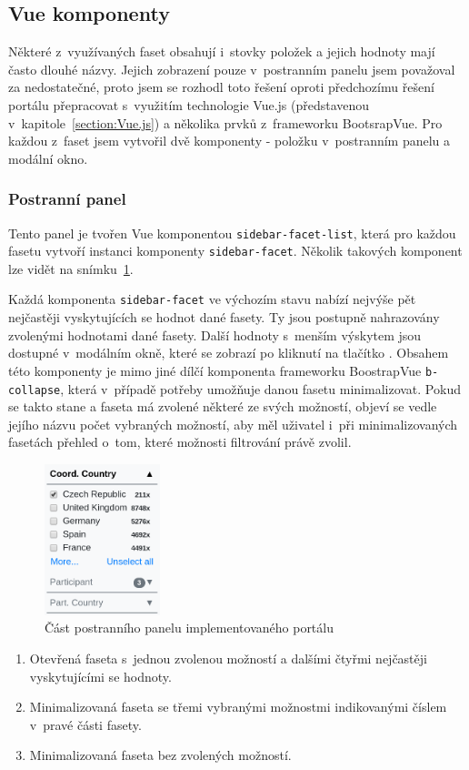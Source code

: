 \subsection{Vue komponenty}
Některé z~využívaných faset obsahují i~stovky položek a jejich hodnoty mají často dlouhé názvy. Jejich zobrazení pouze v~postranním panelu jsem považoval za nedostatečné, proto jsem se rozhodl toto řešení oproti předchozímu řešení portálu přepracovat s~využitím technologie Vue.js (představenou v~kapitole~\ref{section:Vue.js}) a několika prvků z~frameworku BootsrapVue. Pro každou z~faset jsem vytvořil dvě komponenty - položku v~postranním panelu a modální okno.

\subsubsection*{Postranní panel}\label{section:sidebar}
Tento panel je tvořen Vue komponentou \texttt{sidebar-facet-list}, která pro každou fasetu vytvoří instanci komponenty \texttt{sidebar-facet}. Několik takových komponent lze vidět na snímku~\ref{img:sidebar}.

Každá komponenta \texttt{sidebar-facet} ve výchozím stavu nabízí nejvýše pět nejčastěji vyskytujících se hodnot dané fasety. Ty jsou postupně nahrazovány zvolenými hodnotami dané fasety. Další hodnoty s~menším výskytem jsou dostupné v~modálním okně, které se zobrazí po kliknutí na tlačítko . Obsahem této komponenty je mimo jiné dílčí komponenta frameworku BoostrapVue \texttt{b-collapse}, která v~případě potřeby umožňuje danou fasetu minimalizovat. Pokud se takto stane a faseta má zvolené některé ze svých možností, objeví se vedle jejího názvu počet vybraných možností, aby měl uživatel i~při minimalizovaných fasetách přehled o~tom, které možnosti filtrování právě zvolil.

\begin{figure}[H]
	\centering
	\includegraphics[width=0.3\textwidth]{obrazky-figures/my-facet.png}
	\caption{Část postranního panelu implementovaného portálu}
	\label{img:sidebar}
\end{figure}
\begin{enumerate}
    \item Otevřená faseta  s~jednou zvolenou možností a dalšími čtyřmi nejčastěji vyskytujícími se hodnoty. %
    \item Minimalizovaná faseta  se třemi vybranými možnostmi indikovanými číslem v~pravé části fasety.
    \item Minimalizovaná faseta  bez zvolených možností.
\end{enumerate}


